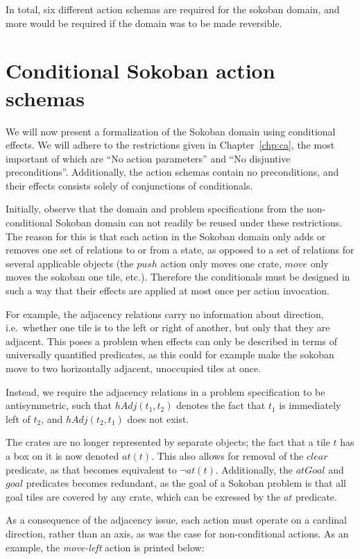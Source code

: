 \documentclass[../Master.tex]{subfiles}
\begin{document}
In total, six different action schemas are required for the sokoban domain, and more would be required if the domain was to be made reversible.

\section{Conditional Sokoban action schemas}

We will now present a formalization of the Sokoban domain using conditional effects. We will adhere to the restrictions given in Chapter~\ref{chp:ca}, the most important of which are ``No action parameters'' and ``No disjuntive preconditions''. Additionally, the action schemas contain no preconditions, and their effects consists solely of conjunctions of conditionals.

Initially, observe that the domain and problem specifications from the non-conditional Sokoban domain can not readily be reused under these restrictions. The reason for this is that each action in the Sokoban domain only adds or removes one set of relations to or from a state, as opposed to a set of relations for several applicable objects (the $push$ action only moves one crate, $move$ only moves the sokoban one tile, etc.). Therefore the conditionals must be designed in such a way that their effects are applied at most once per action invocation.

For example, the adjacency relations carry no information about direction, i.e.\ whether one tile is to the left or right of another, but only that they are adjacent. This poses a problem when effects can only be described in terms of universally quantified predicates, as this could for example make the sokoban move to two horizontally adjacent, unoccupied tiles at once.

Instead, we require the adjacency relations in a problem specification to be antisymmetric, such that $hAdj\left( t_1, t_2\right)$ denotes the fact that $t_1$ is immediately left of $t_2$, and $hAdj\left( t_2, t_1\right)$ does not exist.

The crates are no longer represented by separate objects; the fact that a tile $t$ has a box on it is now denoted $at(t)$. This also allows for removal of the $clear$ predicate, as that becomes equivalent to $\neg at(t)$. Additionally, the $atGoal$ and $goal$ predicates becomes redundant, as the goal of a Sokoban problem is that all goal tiles are covered by any crate, which can be exressed by the $at$ predicate.

As a consequence of the adjacency issue, each action must operate on a cardinal direction, rather than an axis, as was the case for non-conditional actions. As an example, the \textit{move-left} action is printed below:
\end{document}
